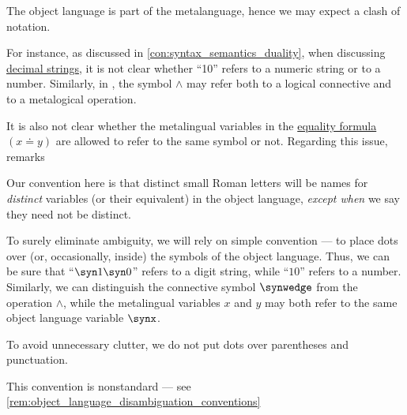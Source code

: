 \begin{remark}\label{rem:object_language_dots}
  The object language is part of the metalanguage, hence we may expect a clash of notation.

  For instance, as discussed in \cref{con:syntax_semantics_duality}, when discussing \hyperref[def:positional_number_system/decimal]{decimal strings}, it is not clear whether \enquote{10} refers to a numeric string or to a number. Similarly, in , the symbol \( {\wedge} \) may refer both to a logical connective and to a metalogical operation.

  It is also not clear whether the metalingual variables in the \hyperref[def:fol_formula]{equality formula} \( (x \doteq y) \) are allowed to refer to the same symbol or not. Regarding this issue, \textcite[78]{Kleene2002Logic} remarks
  \begin{displayquote}
    Our convention here is that distinct small Roman letters will be names for \textit{distinct} variables (or their equivalent) in the object language, \textit{except when} we say they need not be distinct.
  \end{displayquote}

  To surely eliminate ambiguity, we will rely on simple convention --- to place dots over (or, occasionally, inside) the symbols of the object language. Thus, we can be sure that \enquote{\( \syn1\syn0 \)} refers to a digit string, while \enquote{\( 10 \)} refers to a number. Similarly, we can distinguish the connective symbol \( {\synwedge} \) from the operation \( {\wedge} \), while the metalingual variables \( x \) and \( y \) may both refer to the same object language variable \( \synx \).

  To avoid unnecessary clutter, we do not put dots over parentheses and punctuation.
\end{remark}
\begin{comments}
  \item This convention is nonstandard --- see \cref{rem:object_language_disambiguation_conventions}
\end{comments}

